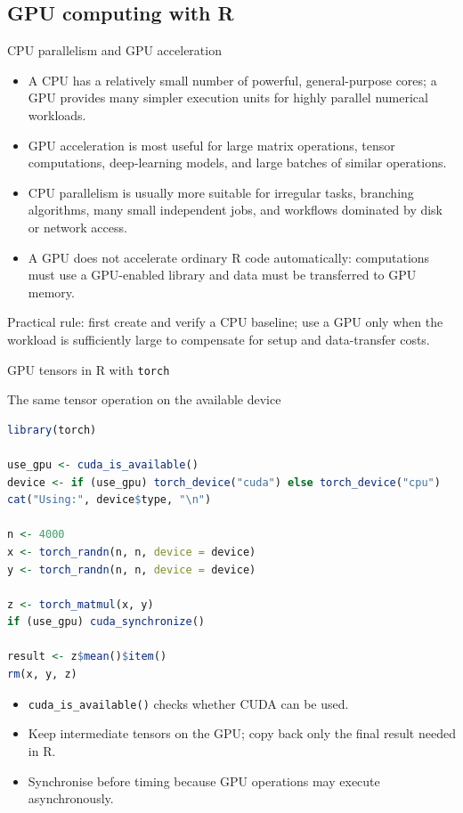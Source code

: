 
\subsection{GPU computing with R}

\begin{frame}{CPU parallelism and GPU acceleration}
\small
\begin{itemize}
  \item A CPU has a relatively small number of powerful, general-purpose cores; a GPU provides many simpler execution units for highly parallel numerical workloads.
  \item GPU acceleration is most useful for large matrix operations, tensor computations, deep-learning models, and large batches of similar operations.
  \item CPU parallelism is usually more suitable for irregular tasks, branching algorithms, many small independent jobs, and workflows dominated by disk or network access.
  \item A GPU does not accelerate ordinary R code automatically: computations must use a GPU-enabled library and data must be transferred to GPU memory.
\end{itemize}
\vspace{0.15cm}
\alert{Practical rule:} first create and verify a CPU baseline; use a GPU only when the workload is sufficiently large to compensate for setup and data-transfer costs.
\end{frame}

\begin{frame}[fragile]{GPU tensors in R with \texttt{torch}}
\begin{block}{The same tensor operation on the available device}
\begin{lstlisting}[language=R,basicstyle=\ttfamily\scriptsize]
library(torch)

use_gpu <- cuda_is_available()
device <- if (use_gpu) torch_device("cuda") else torch_device("cpu")
cat("Using:", device$type, "\n")

n <- 4000
x <- torch_randn(n, n, device = device)
y <- torch_randn(n, n, device = device)

z <- torch_matmul(x, y)
if (use_gpu) cuda_synchronize()

result <- z$mean()$item()
rm(x, y, z)
\end{lstlisting}
\end{block}
\begin{itemize}
  \item \texttt{cuda\_is\_available()} checks whether CUDA can be used.
  \item Keep intermediate tensors on the GPU; copy back only the final result needed in R.
  \item Synchronise before timing because GPU operations may execute asynchronously.
\end{itemize}
\end{frame}

